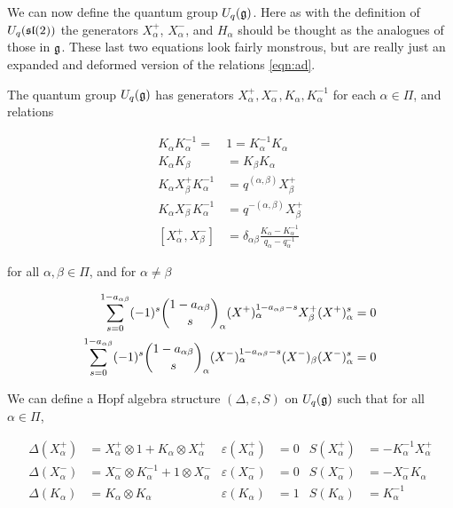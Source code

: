         We can now define the quantum group $U_q(\mathfrak{g})$. Here as with the
        definition of $U_q(\mathfrak{sl}(2))$ the generators $X^+_\alpha$, $X^-_\alpha$,
        and $H_\alpha$ should be thought as the analogues of those in $\mathfrak{g}$.
        These last two equations look fairly monstrous, but are really just an
        expanded and deformed version of the relations \ref{eqn:ad}.
    \begin{defn}
    \label{UqgDef}
        The quantum group $U_q(\mathfrak{g})$ has generators
        $ X^+ _\alpha, X^-_\alpha, K_\alpha, K_\alpha^{-1}$ for each $\alpha \in
        \Pi$, and relations

        \begin{align}
            K_\alpha K_\alpha^{-1} =\ &1  = K_\alpha^{-1}K_\alpha \\
            K_\alpha K_\beta &= K_\beta K_\alpha \\
            K_\alpha  X^+ _\beta K_\alpha^{-1} &= q^{(\alpha, \beta)}  X^+ _\beta \\
            K_\alpha X^-_\beta K_\alpha^{-1} &= q^{-(\alpha, \beta)}  X^+ _\beta \\
            [ X^+ _\alpha, X^-_\beta] &= \delta_{\alpha\beta} \frac{K_\alpha - K_\alpha^{-1}}{ q_\alpha - q_\alpha^{-1}} 
        \end{align}

        for all $\alpha, \beta \in \Pi$, and for $\alpha \neq \beta$

        \begin{align}
            \sum_{s=0}^{1-a_{\alpha\beta}} (-1)^s \dbinom{1-a_{\alpha\beta}}{s}_\alpha  (X^+)_\alpha^{1-a_{\alpha\beta} - s}  X^+_\beta  (X^+)_\alpha^s  &= 0 \\
            \sum_{s=0}^{1-a_{\alpha\beta}} (-1)^s \dbinom{1-a_{\alpha\beta}}{s}_\alpha (X^-)_\alpha^{1-a_{\alpha\beta} - s} (X^-)_\beta (X^-)_\alpha^s  &= 0 
        \end{align}

    \end{defn}

We can define a Hopf algebra structure $(\Delta, \varepsilon, S)$ on
$U_q(\mathfrak{g})$ such that for all $\alpha \in \Pi$,

    \begin{align}
        \Delta(X^+ _\alpha) &=  X^+ _\alpha \otimes 1 + K_\alpha \otimes  X^+ _\alpha      & \varepsilon(X^+ _\alpha) &= 0  & S(X^+ _\alpha) &= -K_\alpha^{-1}  X^+ _\alpha \\
        \Delta(X^-_\alpha) &= X^-_\alpha \otimes K_\alpha^{-1} + 1 \otimes X^-_\alpha & \varepsilon(X^-_\alpha) &= 0  & S(X^-_\alpha) &= -X^-_\alpha K_\alpha \\
        \Delta(K_\alpha) &= K_\alpha \otimes K_\alpha                           & \varepsilon(K_\alpha) &= 1  & S(K_\alpha) &= K_\alpha^{-1}
    \end{align}


